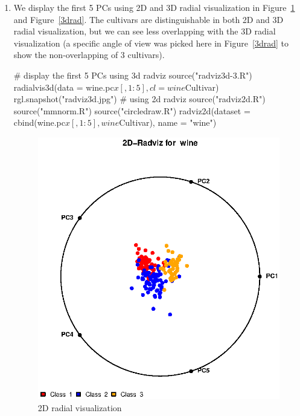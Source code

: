 \documentclass{article}
\begin{document}
\begin{enumerate}[leftmargin = 0 em, label = \arabic*., font = \bfseries]
\newpage
\item
We display the first 5 PCs using 2D and 3D radial visualization in Figure~\ref{2drad} and Figure~\ref{3drad}. The cultivars are distinguishable in both 2D and 3D radial visualization, but we can see less overlapping with the 3D radial visualization (a specific angle of view was picked here in Figure~\ref{3drad} to show the non-overlapping of 3 cultivars).
\begin{rcode}
# display the first 5 PCs using 3d radviz
source("radviz3d-3.R")
radialvis3d(data = wine.pc$x[,1:5], cl = wine$Cultivar)
rgl.snapshot("radviz3d.jpg")
# using 2d radviz
source("radviz2d.R")
source("mmnorm.R")
source("circledraw.R")
radviz2d(dataset = cbind(wine.pc$x[,1:5], wine$Cultivar), name = "wine")
\end{rcode}

\begin{figure}[!htb]
	\centering
	\includegraphics[width = \textwidth]{radviz2d.eps}
	\caption{2D radial visualization}
	\label{2drad}
\end{figure}


\end{enumerate}
\end{document}
